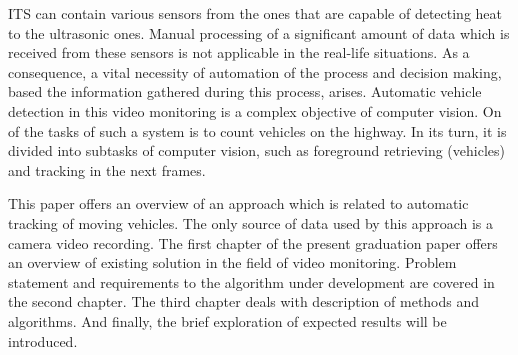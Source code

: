 \documentclass[12pt,a4paper,oneside,titlepage]{article}
\begin{document}
ITS can contain various sensors from the ones that are capable of detecting heat to the ultrasonic ones.
Manual processing of a significant amount of data which is received from these sensors is not applicable in the real-life situations.
As a consequence, a vital necessity of automation of the process and decision making, based the information gathered during this process, arises.
Automatic vehicle detection in this video monitoring is a complex objective of computer vision.
On of the tasks of such a system is to count vehicles on the highway.
In its turn, it is divided into subtasks of computer vision, such as foreground retrieving (vehicles) and tracking in the next frames.

This paper offers an overview of an approach which is related to automatic tracking of moving vehicles.
The only source of data used by this approach is a camera video recording.
The first chapter of the present graduation paper offers an overview of existing solution in the field of video monitoring.
Problem statement and requirements to the algorithm under development are covered in the second chapter.
The third chapter deals with description of methods and algorithms.
And finally, the brief exploration of expected results will be introduced.
\end{document}

